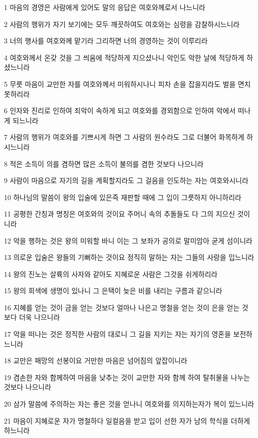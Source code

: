 \par 1 마음의 경영은 사람에게 있어도 말의 응답은 여호와께로서 나느니라
\par 2 사람의 행위가 자기 보기에는 모두 깨끗하여도 여호와는 심령을 감찰하시느니라
\par 3 너의 행사를 여호와께 맡기라 그리하면 너의 경영하는 것이 이루리라
\par 4 여호와께서 온갖 것을 그 씌움에 적당하게 지으셨나니 악인도 악한 날에 적당하게 하셨느니라
\par 5 무릇 마음이 교만한 자를 여호와께서 미워하시나니 피차 손을 잡을지라도 벌을 면치 못하리라
\par 6 인자와 진리로 인하여 죄악이 속하게 되고 여호와를 경외함으로 인하여 악에서 떠나게 되느니라
\par 7 사람의 행위가 여호와를 기쁘시게 하면 그 사람의 원수라도 그로 더불어 화목하게 하시느니라
\par 8 적은 소득이 의를 겸하면 많은 소득이 불의를 겸한 것보다 나으니라
\par 9 사람이 마음으로 자기의 길을 계획할지라도 그 걸음을 인도하는 자는 여호와시니라
\par 10 하나님의 말씀이 왕의 입술에 있은즉 재판할 때에 그 입이 그릇하지 아니하리라
\par 11 공평한 간칭과 명칭은 여호와의 것이요 주머니 속의 추돌들도 다 그의 지으신 것이니라
\par 12 악을 행하는 것은 왕의 미워할 바니 이는 그 보좌가 공의로 말미암아 굳게 섬이니라
\par 13 의로운 입술은 왕들의 기뻐하는 것이요 정직히 말하는 자는 그들의 사랑을 입느니라
\par 14 왕의 진노는 살륙의 사자와 같아도 지혜로운 사람은 그것을 쉬게하리라
\par 15 왕의 희색에 생명이 있나니 그 은택이 늦은 비를 내리는 구름과 같으니라
\par 16 지혜를 얻는 것이 금을 얻는 것보다 얼마나 나은고 명철을 얻는 것이 은을 얻는 것보다 더욱 나으니라
\par 17 악을 떠나는 것은 정직한 사람의 대로니 그 길을 지키는 자는 자기의 영혼을 보전하느니라
\par 18 교만은 패망의 선봉이요 거만한 마음은 넘어짐의 앞잡이니라
\par 19 겸손한 자와 함께하여 마음을 낮추는 것이 교만한 자와 함께 하여 탈취물을 나누는 것보다 나으니라
\par 20 삼가 말씀에 주의하는 자는 좋은 것을 얻나니 여호와를 의지하는자가 복이 있느니라
\par 21 마음이 지혜로운 자가 명철하다 일컬음을 받고 입이 선한 자가 남의 학식을 더하게 하느니라
